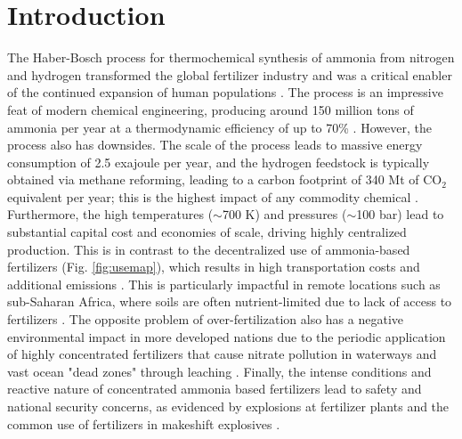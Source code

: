 \section{Introduction}

The Haber-Bosch process for thermochemical synthesis of ammonia from nitrogen and hydrogen transformed the global fertilizer industry and was a critical enabler of the continued expansion of human populations \cite{Smil_1999}. The process is an impressive feat of modern chemical engineering, producing around 150 million tons of ammonia per year at a thermodynamic efficiency of up to 70\% \cite{Schloegl_2003,Schiffer_2017}. However, the process also has downsides. The scale of the process leads to massive energy consumption of 2.5 exajoule per year, and the hydrogen feedstock is typically obtained via methane reforming, leading to a carbon footprint of 340 Mt of CO$_2$ equivalent per year; this is the highest impact of any commodity chemical \cite{Schiffer_2017}. Furthermore, the high temperatures ($\sim$700 K) and pressures ($\sim$100 bar) lead to substantial capital cost and economies of scale, driving highly centralized production. This is in contrast to the decentralized use of ammonia-based fertilizers (Fig. \ref{fig:usemap}), which results in high transportation costs and additional emissions \cite{West_2002}. This is particularly impactful in remote locations such as sub-Saharan Africa, where soils are often nutrient-limited due to lack of access to fertilizers \cite{Gilbert_2012, Mueller_2012}. The opposite problem of over-fertilization also has a negative environmental impact in more developed nations due to the periodic application of highly concentrated fertilizers that cause nitrate pollution in waterways and vast ocean "dead zones" through leaching \cite{Diaz2008}. Finally, the intense conditions and reactive nature of concentrated ammonia based fertilizers lead to safety and national security concerns, as evidenced by explosions at fertilizer plants and the common use of fertilizers in makeshift explosives \cite{Marlair_2005}.


